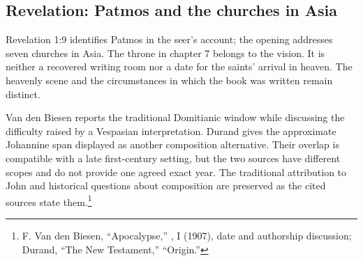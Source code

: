 \subsection{Revelation: Patmos and the churches in Asia}
\label{history-apocalypse}
Revelation 1:9 identifies Patmos in the seer's account; the opening addresses seven churches in Asia. The throne in chapter 7 belongs to the vision. It is neither a recovered writing room nor a date for the saints' arrival in heaven. The heavenly scene and the circumstances in which the book was written remain distinct.

Van den Biesen reports the traditional Domitianic window while discussing the difficulty raised by a Vespasian interpretation. Durand gives the approximate Johannine span displayed as another composition alternative. Their overlap is compatible with a late first-century setting, but the two sources have different scopes and do not provide one agreed exact year. The traditional attribution to John and historical questions about composition are preserved as the cited sources state them.\footnote{F. Van den Biesen, ``Apocalypse,'' , I (1907), date and authorship discussion; Durand, ``The New Testament,'' ``Origin.''}
